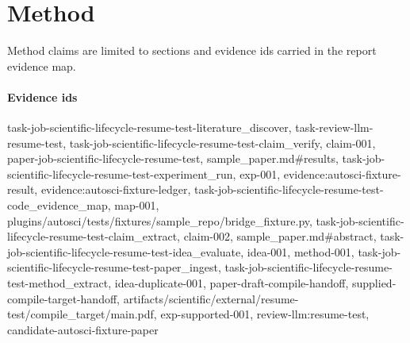 \section{Method}
Method claims are limited to sections and evidence ids carried in the report evidence map.

\paragraph{Evidence ids} task-job-scientific-lifecycle-resume-test-literature\_discover, task-review-llm-resume-test, task-job-scientific-lifecycle-resume-test-claim\_verify, claim-001, paper-job-scientific-lifecycle-resume-test, sample\_paper.md\#results, task-job-scientific-lifecycle-resume-test-experiment\_run, exp-001, evidence:autosci-fixture-result, evidence:autosci-fixture-ledger, task-job-scientific-lifecycle-resume-test-code\_evidence\_map, map-001, plugins/autosci/tests/fixtures/sample\_repo/bridge\_fixture.py, task-job-scientific-lifecycle-resume-test-claim\_extract, claim-002, sample\_paper.md\#abstract, task-job-scientific-lifecycle-resume-test-idea\_evaluate, idea-001, method-001, task-job-scientific-lifecycle-resume-test-paper\_ingest, task-job-scientific-lifecycle-resume-test-method\_extract, idea-duplicate-001, paper-draft-compile-handoff, supplied-compile-target-handoff, artifacts/scientific/external/resume-test/compile\_target/main.pdf, exp-supported-001, review-llm:resume-test, candidate-autosci-fixture-paper
